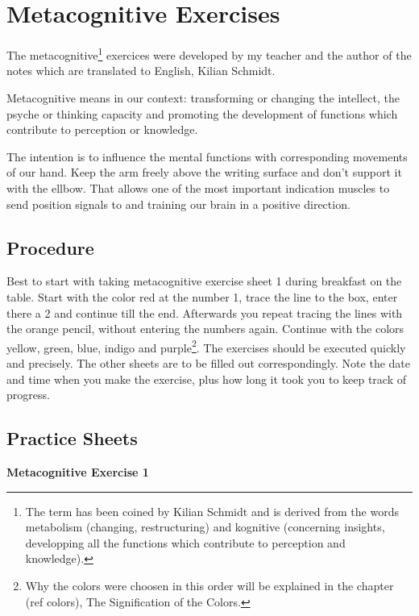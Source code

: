 \documentclass[../main.tex]{subfiles}
\begin{document}
  \chapter{Metacognitive Exercises}\label{metacognitive}
  The metacognitive\footnote{The term has been coined by Kilian Schmidt and is derived from the words metabolism (changing, restructuring) and kognitive (concerning insights, developping all the functions which contribute to perception and knowledge).} exercices were developed by my teacher and the author of the notes which are translated to English, Kilian Schmidt.


Metacognitive means in our context: {transforming} or changing the {intellect}, the
psyche or {thinking capacity}  and promoting the development of
functions which contribute to perception or knowledge.



The intention is to {influence the mental functions} with corresponding {movements of our hand}.
Keep the arm freely above the writing surface and don't support it with the ellbow. {That allows one of the most important indication muscles to  send position signals to and training our brain in a positive direction.}

\section{Procedure}

Best to start with taking metacognitive exercise sheet 1 during breakfast on the table. Start with the color red at the number 1, trace the line to the box, enter there a 2 and continue till the end. Afterwards you repeat tracing the lines with the orange pencil, without entering the numbers again. Continue with the colors yellow, green, blue, indigo and purple\footnote{Why the colors were choosen in this order will be explained in the chapter (ref colors), The Signification of the Colors.}. The exercises should be executed quickly and precisely. The other sheets are to be filled out correspondingly. Note the date and time when you make the exercise, plus how long it took you to keep track of progress.


\newpage
\section{Practice Sheets}

\noindent \textbf{Metacognitive Exercise 1}
\end{document}
